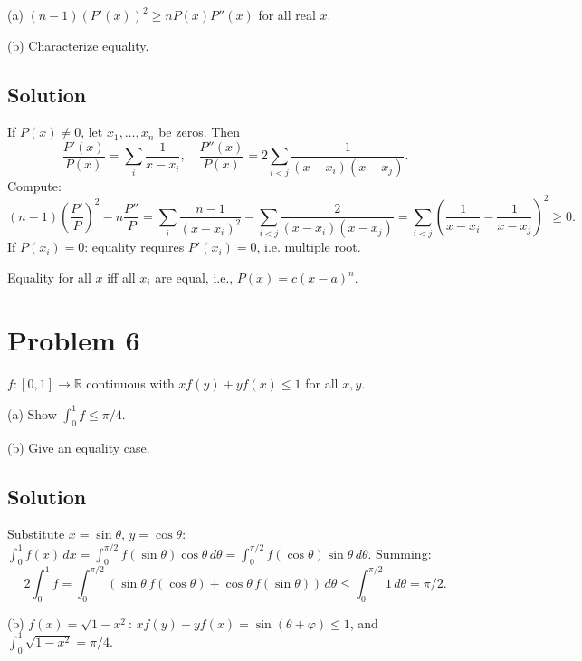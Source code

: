 \documentclass{article}
\begin{document}
(a) $(n-1)(P'(x))^2 \ge nP(x)P''(x)$ for all real $x$.

(b) Characterize equality.

\subsection*{Solution}
If $P(x)\ne 0$, let $x_1,\dots,x_n$ be zeros. Then
\[\frac{P'(x)}{P(x)} = \sum_i \frac{1}{x-x_i},\quad \frac{P''(x)}{P(x)} = 2\sum_{i<j}\frac{1}{(x-x_i)(x-x_j)}.\]
Compute:
\[(n-1)\left(\frac{P'}{P}\right)^2 - n\frac{P''}{P} = \sum_i \frac{n-1}{(x-x_i)^2} - \sum_{i<j}\frac{2}{(x-x_i)(x-x_j)} = \sum_{i<j}\left(\frac{1}{x-x_i} - \frac{1}{x-x_j}\right)^2 \ge 0.\]
If $P(x_i)=0$: equality requires $P'(x_i)=0$, i.e. multiple root.

Equality for all $x$ iff all $x_i$ are equal, i.e., $P(x) = c(x-a)^n$.

\section*{Problem 6}
$f:[0,1]\to\mathbb{R}$ continuous with $xf(y)+yf(x)\le 1$ for all $x,y$.

(a) Show $\int_0^1 f \le \pi/4$.

(b) Give an equality case.

\subsection*{Solution}
Substitute $x=\sin\theta$, $y=\cos\theta$: $\int_0^1 f(x)\,dx = \int_0^{\pi/2} f(\sin\theta)\cos\theta\,d\theta = \int_0^{\pi/2}f(\cos\theta)\sin\theta\,d\theta$. Summing:
\[2\int_0^1 f = \int_0^{\pi/2}(\sin\theta\, f(\cos\theta) + \cos\theta\, f(\sin\theta))\,d\theta \le \int_0^{\pi/2}1\,d\theta = \pi/2.\]

(b) $f(x) = \sqrt{1-x^2}$: $xf(y)+yf(x) = \sin(\theta+\varphi) \le 1$, and $\int_0^1 \sqrt{1-x^2} = \pi/4$.
\end{document}
